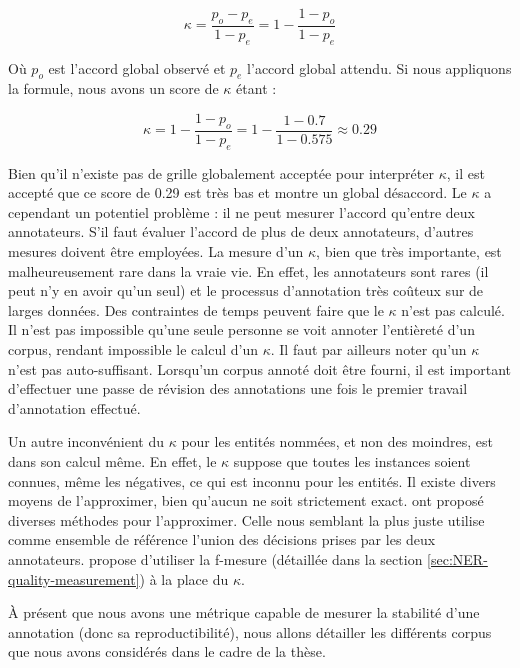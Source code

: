 \documentclass[PhD-Yoann-Dupont.tex]{subfiles}
\begin{document}
\begin{equation}\label{eq:kappa-definition}
\kappa = \frac{p_{o} - p_{e}}{1 - p_{e}} = 1 - \frac{1 - p_{o}}{1 - p_{e}}
\end{equation}

Où $p_{o}$ est l'accord global observé et $p_{e}$ l'accord global attendu. Si nous appliquons la formule, nous avons un score de $\kappa$ étant :

\begin{equation}\label{eq:kappa-here}
\kappa = 1 - \frac{1 - p_{o}}{1 - p_{e}} = 1 - \frac{1 - 0.7}{1 - 0.575} \approx 0.29
\end{equation}

Bien qu'il n'existe pas de  grille globalement acceptée pour interpréter $\kappa$, il est accepté que ce score de 0.29 est très bas et montre un global désaccord. Le $\kappa$ a cependant un potentiel problème : il ne peut mesurer l'accord qu'entre deux annotateurs. S'il faut évaluer l'accord de plus de deux annotateurs, d'autres mesures doivent être employées. La mesure d'un $\kappa$, bien que très importante, est malheureusement rare dans la vraie vie. En effet, les annotateurs sont rares (il peut n'y en avoir qu'un seul) et le processus d'annotation très coûteux sur de larges données. Des contraintes de temps peuvent faire que le $\kappa$ n'est pas calculé. Il n'est pas impossible qu'une seule personne se voit annoter l'entièreté d'un corpus, rendant impossible le calcul d'un $\kappa$. Il faut par ailleurs noter qu'un $\kappa$ n'est pas auto-suffisant. Lorsqu'un corpus annoté doit être fourni, il est important d'effectuer une passe de révision des annotations une fois le premier travail d'annotation effectué.

Un autre inconvénient du $\kappa$ pour les entités nommées, et non des moindres, est dans son calcul même. En effet, le $\kappa$ suppose que toutes les instances soient connues, même les négatives, ce qui est inconnu pour les entités. Il existe divers moyens de l'approximer, bien qu'aucun ne soit strictement exact. \citet{grouin2011proposal} ont proposé diverses méthodes pour l'approximer. Celle nous semblant la plus juste utilise comme ensemble de référence l'union des décisions prises par les deux annotateurs. \citet{deleger2012building} propose d'utiliser la f-mesure (détaillée dans la section \ref{sec:NER-quality-measurement}) à la place du $\kappa$.

À présent que nous avons une métrique capable de mesurer la stabilité d'une annotation (donc sa reproductibilité), nous allons détailler les différents corpus que nous avons considérés dans le cadre de la thèse.
\end{document}
